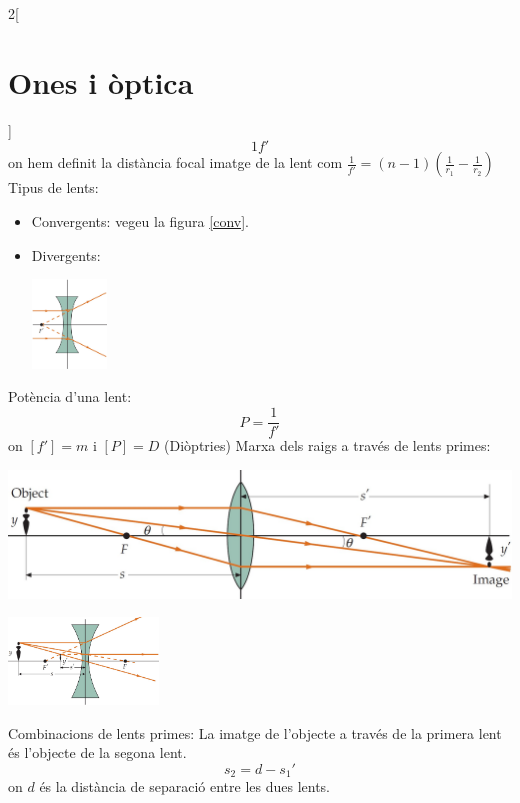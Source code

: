 \documentclass[class=article,10pt,crop=false]{standalone}
\begin{document}
\begin{multicols}{2}[\section{Ones i òptica}]
$${1}{f'}$$ {\footnotesize on hem definit la distància focal imatge de la lent com $\frac{
1}{f'}=(n-1)\left(\frac{1}{r_1}-\frac{1}{r_2}\right)$}\newline
Tipus de lents:
\begin{itemize}
    \item Convergents: {\footnotesize vegeu la figura \ref{conv}.}
    \item Divergents:\newline
    \begin{minipage}{\linewidth}
    \centering
    \includegraphics[width=2cm]{Physics/1st/Waves_and_optics/Images/div.jpg} 
\end{minipage}
\end{itemize}
Potència d'una lent: $$P=\frac{1}{f'}$$ {\footnotesize on $[f']=m$ i $[P]=D$ (Diòptries)}\newline
Marxa dels raigs a través de lents primes:
\begin{minipage}{\linewidth}
    \centering
    \includegraphics[width=\linewidth]{Physics/1st/Waves_and_optics/Images/raiglen.jpg} 
\end{minipage}
\begin{minipage}{\linewidth}
    \centering
    \includegraphics[width=4cm]{Physics/1st/Waves_and_optics/Images/raiglen2.jpg} 
\end{minipage}
Combinacions de lents primes: La imatge de l'objecte a través de la primera lent és l'objecte de la segona lent. $$s_2=d-s_1'$$ {\footnotesize on $d$ és la distància de separació entre les dues lents.}

\end{multicols}
\end{document}
